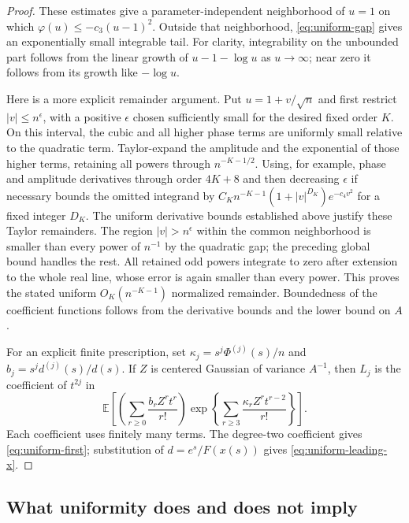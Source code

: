 \begin{proof}
These estimates give a parameter-independent neighborhood of $u=1$
on which $\varphi(u)\le-c_3(u-1)^2$. Outside that neighborhood,
\eqref{eq:uniform-gap} gives an exponentially small integrable tail.
For clarity, integrability on the unbounded part follows from the linear
growth of $u-1-\log u$ as $u\to\infty$; near zero it follows from its
growth like $-\log u$.

Here is a more explicit remainder argument. Put $u=1+v/\sqrt n$ and
first restrict $|v|\le n^\epsilon$, with a positive $\epsilon$ chosen
sufficiently small for the desired fixed order $K$. On this interval,
the cubic and all higher phase terms are uniformly small relative to
the quadratic term. Taylor-expand the amplitude and the exponential
of those higher terms, retaining all powers through $n^{-K-1/2}$.
Using, for example, phase and amplitude derivatives through order
$4K+8$ and then decreasing $\epsilon$ if necessary bounds the omitted
integrand by $C_K n^{-K-1}(1+|v|^{D_K})e^{-c_4v^2}$ for a fixed
integer $D_K$. The uniform derivative bounds established above justify
these Taylor remainders. The region $|v|>n^\epsilon$ within the common
neighborhood is smaller than every power of $n^{-1}$ by the quadratic
gap; the preceding global bound handles the rest. All retained odd
powers integrate to zero after extension to the whole real line,
whose error is again smaller than every power. This proves the stated
uniform $O_K(n^{-K-1})$ normalized remainder. Boundedness of the
coefficient functions follows from the derivative bounds and the
lower bound on $A$.

For an explicit finite prescription, set
$\kappa_j=s^j\Phi^{(j)}(s)/n$ and
$b_j=s^j d^{(j)}(s)/d(s)$. If $Z$ is centered Gaussian of variance
$A^{-1}$, then $L_j$ is the coefficient of $t^{2j}$ in
\begin{equation}\label{eq:uniform-coefficient-rule}
 \mathbb E\left[
 \left(\sum_{r\ge0}\frac{b_r Z^r t^r}{r!}\right)
 \exp\left\{\sum_{r\ge3}\frac{\kappa_rZ^r t^{r-2}}{r!}\right\}
 \right].
\end{equation}
Each coefficient uses finitely many terms. The degree-two coefficient
gives \eqref{eq:uniform-first}; substitution of $d=e^s/F(x(s))$
gives \eqref{eq:uniform-leading-x}.
\end{proof}

\subsection{What uniformity does and does not imply}

